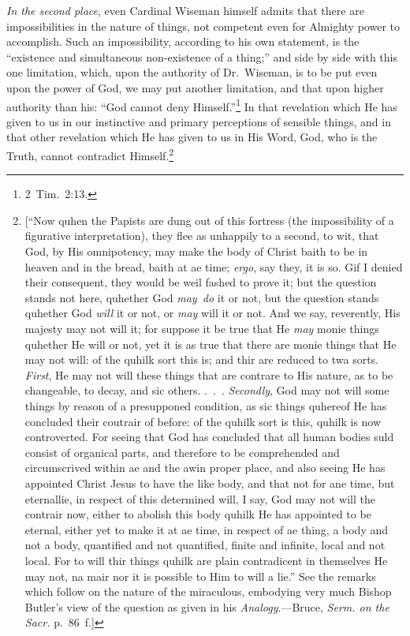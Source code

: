 \documentclass[
  english,
]{book}
\begin{document}
\emph{In the second place}, even Cardinal Wiseman himself admits that there are impossibilities in the nature of things, not competent even for Almighty power to accomplish. Such an impossibility, according to his own statement, is the ``existence and simultaneous non-existence of a thing;'' and side by side with this one limitation, which, upon the authority of Dr.~Wiseman, is to be put even upon the power of God, we may put another limitation, and that upon higher authority than his: ``God cannot deny Himself.''\footnote{2~Tim.~2:13.} In that revelation which He has given to us in our instinctive and primary perceptions of sensible things, and in that other revelation which He has given to us in His Word, God, who is the Truth, cannot contradict Himself.\footnote{{[}``Now quhen the Papists are dung out of this fortress (the impossibility of a figurative interpretation), they flee as unhappily to a second, to wit, that God, by His omnipotency, may make the body of Christ baith to be in heaven and in the bread, baith at ae time; \emph{ergo}, say they, it is so. Gif I denied their consequent, they would be weil fashed to prove it; but the question stands not here, quhether God \emph{may~do} it or not, but the question stands quhether God \emph{will} it or not, or \emph{may} will it or not. And we say, reverently, His majesty may not will it; for suppose it be true that He \emph{may} monie things quhether He will or not, yet it is as true that there are monie things that He may not will: of the quhilk sort this is; and thir are reduced to twa sorts. \emph{First}, He may not will these things that are contrare to His nature, as to be changeable, to decay, and sic others. .~.~. \emph{Secondly}, God may not will some things by reason of a presupponed condition, as sic things quhereof He has concluded their coutrair of before: of the quhilk sort is this, quhilk is now controverted. For seeing that God has concluded that all human bodies suld consist of organical parts, and therefore to be comprehended and circumscrived within ae and the awin proper place, and also seeing He has appointed Christ Jesus to have the like body, and that not for ane time, but eternallie, in respect of this determined will, I say, God may not will the contrair now, either to abolish this body quhilk He has appointed to be eternal, either yet to make it at ae time, in respect of ae thing, a body and not a body, quantified and not quantified, finite and infinite, local and not local. For to will thir things quhilk are plain contradicent in themselves He may not, na mair nor it is possible to Him to will a lie.'' See the remarks which follow on the nature of the miraculous, embodying very much Bishop Butler's view of the question as given in his \emph{Analogy}.---Bruce, \emph{Serm. on the Sacr.} p.~86~f.{]}}
\end{document}
